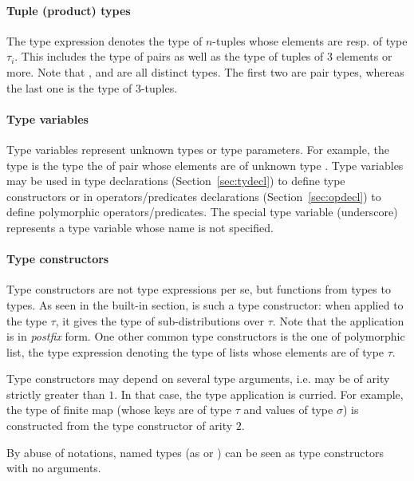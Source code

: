 \paragraph{Tuple (product) types}
The type expression  denotes the
type of $n$-tuples whose elements are resp. of type $\tau_i$. This
includes the type of pairs as well as the type of tuples of $3$ elements
or more.
%
Note that ,  and
 are all distinct types. The first two
are pair types, whereas the last one is the type of $3$-tuples.

\paragraph{Type variables}
Type variables represent unknown types or type parameters. For example,
the type  is the type the of pair whose elements
are of unknown type . Type variables may be used in type declarations
(Section~\ref{sec:tydecl}) to define type constructors or in
operators/predicates declarations (Section~\ref{sec:opdecl}) to define
polymorphic operators/predicates. The special type variable \ec{_}
(underscore) represents a type variable whose name is not specified.

\paragraph{Type constructors}

Type constructors are not type expressions per se, but functions from
types to types. As seen in the built-in section,  is such
a type constructor: when applied to the type $\tau$, it gives the
type  of sub-distributions over $\tau$. Note that the
application is in \emph{postfix} form. One other common type constructors
is the one  of polymorphic list, the type expression
 denoting the type of lists whose elements are of type $\tau$.

Type constructors may depend on several type arguments, i.e. may be
of arity strictly greater than $1$. In that case,
the type application is curried. For example, the type of finite map
 (whose keys are of type $\tau$ and values of
type $\sigma$) is constructed from the type constructor  of
arity $2$.

By abuse of notations, named types (as  or ) can be seen
as type constructors with no arguments.

